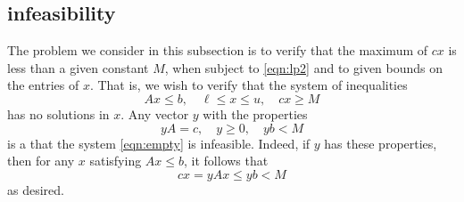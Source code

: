 %
%


\subsection{infeasibility}

The problem we consider in this subsection is to verify that the
maximum of $c x$ is less than a given constant $M$, when subject to
\eqref{eqn:lp2} and to given bounds on the entries of $x$.
That is, we wish to verify that the system of inequalities
\begin{equation}\label{eqn:empty}
A x \le b,\quad \ell \le x\le u,\quad c x \ge M
\end{equation}
has no solutions in $x$. Any vector $y$ with the properties
\begin{equation}\label{eqn:y}
  y A = c,\quad y\ge 0,\quad y b < M
\end{equation}
is a  that the system \eqref{eqn:empty} is infeasible.  Indeed,
if $y$ has these properties, then for any $x$ satisfying
$A x \le b$, it follows that
\begin{equation}\label{eqn:cxM}
  c x = y A x \le y b < M
\end{equation}
as desired.


